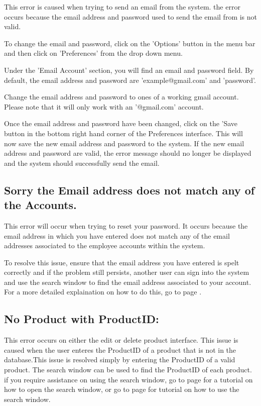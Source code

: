This error is caused when trying to send an email from the system. the error occurs because the email address and password used to send the email from is not valid.

To change the email and password, click on the 'Options' button in the menu bar and then click on 'Preferences' from the drop down menu.

Under the 'Email Account' section, you will find an email and password field. By default, the email address and password are 'example@gmail.com' and 'password'.

Change the email address and password to ones of a working gmail account. Please note that it will only work with an '@gmail.com' account.

Once the email address and password have been changed, click on the 'Save button in the bottom right hand corner of the Preferences interface. This will now save the new email address and password to the system. If the new email address and password are valid, the error message should no longer be displayed and the system should successfully send the email.

\subsection{Sorry the Email address does not match any of the Accounts.}

This error will occur when trying to reset your password. It occurs because the email address in which you have entered does not match any of the email addresses associated to the employee accounts within the system.

To resolve this issue, ensure that the email address you have entered is spelt correctly and if the problem still persists, another user can sign into the system and use the search window to find the email address associated to your account. For a more detailed explaination on how to do this, go to page \pageref{fig:Using the search window}.

\subsection{No Product with ProductID:}

This error occurs on either the edit or delete product interface. This issue is caused when the user enteres the ProductID of a product that is not in the database.This issue is resolved simply by entering the ProductID of a valid product. The search window can be used to find the ProductID of each product. if you require assistance on using the search window, go to page \pageref{fig:Accessing the search window} for a tutorial on how to open the search window, or go to page \pageref{fig:Using the search window} for tutorial on how to use the search window.

